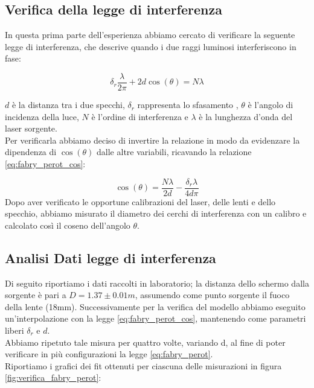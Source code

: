 \documentclass[letterpaper,12pt]{article}
\begin{document}
\subsection{Verifica della legge di interferenza}

In questa prima parte dell'esperienza abbiamo cercato di verificare
la seguente legge di interferenza, che descrive quando i due raggi luminosi interferiscono in fase:

\begin{equation}
    \delta_r \frac{\lambda}{2 \pi} + 2d \cos(\theta) = N \lambda
    \label{eq:fabry_perot}
\end{equation}

$d$ è la distanza tra i due specchi, $\delta_r$ rappresenta lo sfasamento , $\theta$ è l'angolo di incidenza della luce, $N$ è l'ordine di interferenza e $\lambda$ 
è la lunghezza d'onda del laser sorgente. \\
Per verificarla abbiamo deciso di invertire la relazione in modo da evidenzare la dipendenza di $\cos(\theta)$ dalle
altre variabili, ricavando la relazione \ref{eq:fabry_perot_cos}:

\begin{equation}
    \cos(\theta) = \frac{N \lambda}{2d} - \frac{\delta_r \lambda}{4 d \pi}
    \label{eq:fabry_perot_cos}
\end{equation}
Dopo aver verificato le opportune calibrazioni del laser, delle lenti e dello specchio,
abbiamo misurato il diametro dei cerchi di interferenza con un calibro e calcolato così il coseno dell'angolo $\theta$.\\

\subsection{Analisi Dati legge di interferenza}
Di seguito riportiamo i dati raccolti in laboratorio; la distanza dello schermo dalla sorgente è pari a $D = 1.37 \pm0.01 m$, assumendo come punto sorgente il fuoco della lente 
(18mm). Successivamente per la verifica del modello abbiamo eseguito un'interpolazione con la legge \ref{eq:fabry_perot_cos}, mantenendo come 
parametri liberi $\delta_r$ e $d$.\\
Abbiamo ripetuto tale misura per quattro volte, variando d, al fine di poter verificare in più configurazioni la 
legge \eqref{eq:fabry_perot}.\\
Riportiamo i grafici dei fit ottenuti per ciascuna delle misurazioni in figura \ref{fig:verifica_fabry_perot}:
\end{document}
